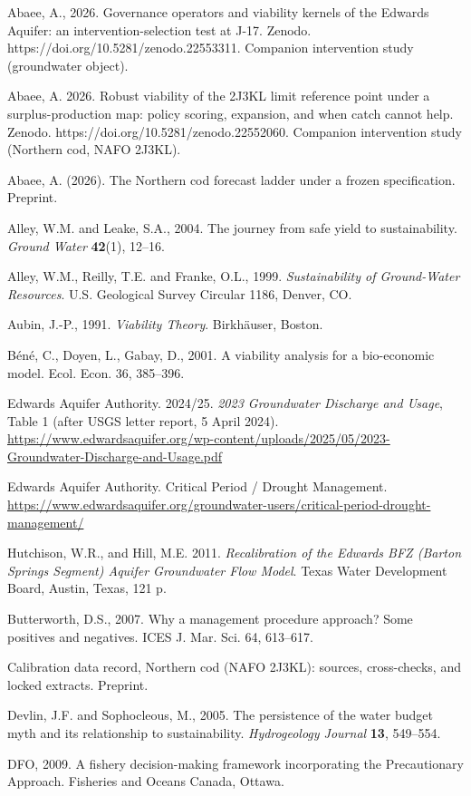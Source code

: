 \documentclass[11pt]{article}
\begin{document}
Abaee, A., 2026. Governance operators and viability kernels of the
Edwards Aquifer: an intervention-selection test at J-17. Zenodo.
https://doi.org/10.5281/zenodo.22553311. Companion intervention study
(groundwater object).

Abaee, A. 2026. Robust viability of the 2J3KL limit reference point
under a surplus-production map: policy scoring, expansion, and when
catch cannot help. Zenodo. https://doi.org/10.5281/zenodo.22552060.
Companion intervention study (Northern cod, NAFO 2J3KL).

Abaee, A. (2026). The Northern cod forecast ladder under a frozen
specification. Preprint.

Alley, W.M. and Leake, S.A., 2004. The journey from safe yield to sustainability.
\emph{Ground Water} \textbf{42}(1), 12--16.

Alley, W.M., Reilly, T.E. and Franke, O.L., 1999. \emph{Sustainability of Ground-Water
Resources}. U.S. Geological Survey Circular 1186, Denver, CO.

Aubin, J.-P., 1991. \emph{Viability Theory}. Birkh\"auser, Boston.


B\'en\'e, C., Doyen, L., Gabay, D., 2001. A viability analysis for a
bio-economic model. Ecol. Econ. 36, 385--396.

Edwards Aquifer Authority. 2024/25. \emph{2023 Groundwater Discharge and
Usage}, Table 1 (after USGS letter report, 5 April 2024).
\url{https://www.edwardsaquifer.org/wp-content/uploads/2025/05/2023-Groundwater-Discharge-and-Usage.pdf}

Edwards Aquifer Authority. Critical Period / Drought Management.
\url{https://www.edwardsaquifer.org/groundwater-users/critical-period-drought-management/}

Hutchison, W.R., and Hill, M.E. 2011. \emph{Recalibration of the Edwards
BFZ (Barton Springs Segment) Aquifer Groundwater Flow Model}. Texas
Water Development Board, Austin, Texas, 121 p.

Butterworth, D.S., 2007. Why a management procedure approach? Some positives and negatives.
ICES J. Mar. Sci. 64, 613--617.

Calibration data record, Northern cod (NAFO 2J3KL):
sources, cross-checks, and locked extracts. Preprint.

Devlin, J.F. and Sophocleous, M., 2005. The persistence of the water budget myth and its
relationship to sustainability. \emph{Hydrogeology Journal} \textbf{13}, 549--554.

DFO, 2009. A fishery decision-making framework incorporating the
Precautionary Approach. Fisheries and Oceans Canada, Ottawa.
\end{document}
